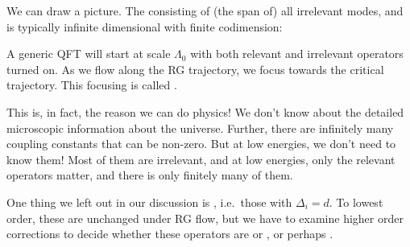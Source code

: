 \documentclass[a4paper]{article}
\begin{document}
We can draw a picture. The  consisting of (the span of) all irrelevant modes, and is typically infinite dimensional with finite codimension:
\begin{center}
\end{center}
A generic QFT will start at scale $\Lambda_0$ with both relevant and irrelevant operators turned on. As we flow along the RG trajectory, we focus towards the critical trajectory. This focusing is called .

This is, in fact, the reason we can do physics! We don't know about the detailed microscopic information about the universe. Further, there are infinitely many coupling constants that can be non-zero. But at low energies, we don't need to know them! Most of them are irrelevant, and at low energies, only the relevant operators matter, and there is only finitely many of them.

One thing we left out in our discussion is , i.e.\ those with $\Delta_i = d$. To lowest order, these are unchanged under RG flow, but we have to examine higher order corrections to decide whether these operators are  or , or perhaps .
\end{document}
